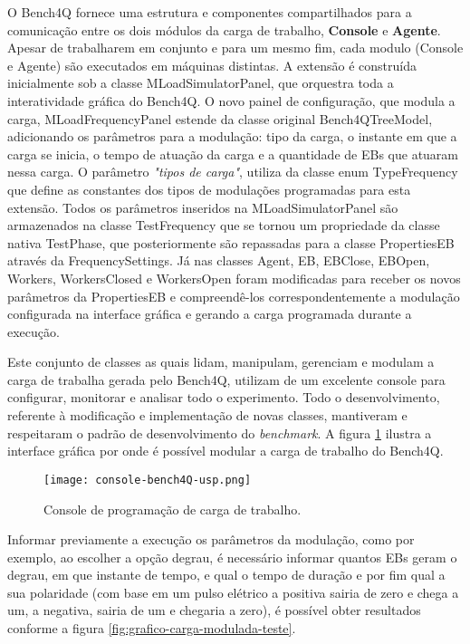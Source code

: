 O Bench4Q fornece uma estrutura e componentes compartilhados para a comunicação entre os dois módulos da carga de trabalho, \textbf{Console} e \textbf{Agente}. Apesar de trabalharem em conjunto e para um mesmo fim, cada modulo (Console e Agente) são executados em máquinas distintas.  A extensão é construída inicialmente sob a classe \textsf{MLoadSimulatorPanel}, que orquestra toda a interatividade gráfica do Bench4Q. O novo painel de configuração, que modula a carga, \textsf{MLoadFrequencyPanel} estende da classe original \textsf{Bench4QTreeModel}, adicionando os parâmetros para a modulação: tipo da carga, o instante em que a carga se inicia, o tempo de atuação da carga e a quantidade de EBs que atuaram nessa carga. O parâmetro \textit{"tipos de carga"}, utiliza da classe enum \textsf{TypeFrequency} que define as constantes dos tipos de modulações programadas para esta extensão.  Todos os parâmetros inseridos na \textsf{MLoadSimulatorPanel} são armazenados na classe \textsf{TestFrequency} que se tornou um propriedade da classe nativa \textsf{TestPhase}, que posteriormente são repassadas para a classe \textsf{PropertiesEB} através da \textsf{FrequencySettings}. Já nas classes \textsf{Agent}, \textsf{EB}, \textsf{EBClose}, \textsf{EBOpen}, \textsf{Workers}, \textsf{WorkersClosed} e \textsf{WorkersOpen} foram modificadas para receber os novos parâmetros da \textsf{PropertiesEB} e compreendê-los correspondentemente a modulação configurada na interface gráfica e gerando a carga programada durante a execução.

Este conjunto de classes as quais lidam, manipulam, gerenciam e modulam a carga de trabalha gerada pelo Bench4Q, utilizam de um excelente console para configurar, monitorar e analisar todo o experimento. Todo o desenvolvimento, referente à modificação e implementação de novas classes, mantiveram e respeitaram o padrão de desenvolvimento do \textit{benchmark}. A figura \ref{fig:interface-criada-beanch4q} ilustra a interface gráfica por onde é possível modular a carga de trabalho do Bench4Q. 

\begin{figure}[htb]
	\centering
	\texttt{[image: console-bench4Q-usp.png]}
	\caption{Console de programação de carga de trabalho.}
	\label{fig:interface-criada-beanch4q}
	\fautor
\end{figure}

Informar previamente a execução os parâmetros da modulação, como por exemplo, ao escolher a opção degrau, é necessário informar quantos EBs geram o degrau, em que instante de tempo, e qual o tempo de duração e por fim qual a sua polaridade (com base em um pulso elétrico a positiva sairia de zero e chega a um, a negativa, sairia de um e chegaria a zero), é possível obter resultados conforme a figura \ref{fig:grafico-carga-modulada-teste}.

